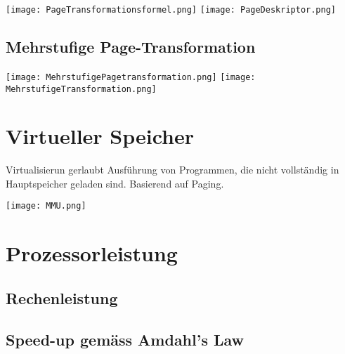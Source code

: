 \begin{center}
    \texttt{[image: PageTransformationsformel.png]}
    \texttt{[image: PageDeskriptor.png]}
\end{center}


\subsection{Mehrstufige Page-Transformation}

\texttt{[image: MehrstufigePagetransformation.png]}
\texttt{[image: MehrstufigeTransformation.png]}


\section{Virtueller Speicher}

Virtualisierun gerlaubt Ausführung von Programmen, die nicht vollständig in Hauptspeicher geladen sind. Basierend auf Paging.

\texttt{[image: MMU.png]}


\section{Prozessorleistung}

\subsection{Rechenleistung}


\subsection{Speed-up gemäss Amdahl's Law}

